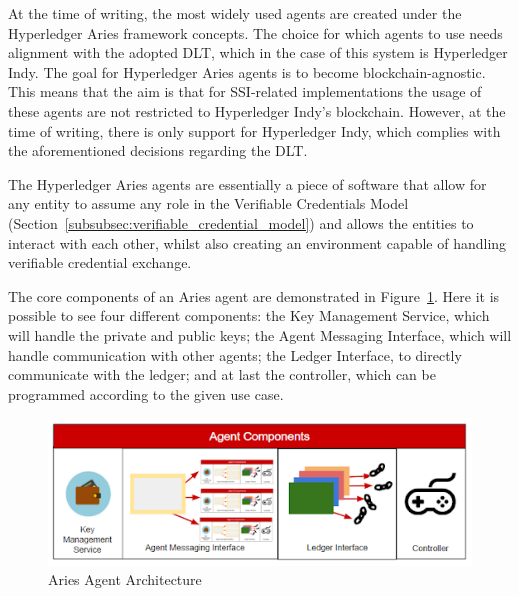 At the time of writing, the most widely used agents are created under the Hyperledger Aries framework concepts. The choice for which agents to use needs alignment with the adopted DLT, which in the case of this system is Hyperledger Indy. The goal for Hyperledger Aries agents is to become blockchain-agnostic. This means that the aim is that for SSI-related implementations the usage of these agents are not restricted to Hyperledger Indy's blockchain. However, at the time of writing, there is only support for Hyperledger Indy, which complies with the aforementioned decisions regarding the DLT.

The Hyperledger Aries agents are essentially a piece of software that allow for any entity to assume any role in the Verifiable Credentials Model (Section~\ref{subsubsec:verifiable_credential_model}) and allows the entities to interact with each other, whilst also creating an environment capable of handling verifiable credential exchange. 

The core components of an Aries agent are demonstrated in Figure~\ref{fig:aries_agent_architecture}. Here it is possible to see four different components: the Key Management Service, which will handle the private and public keys; the Agent Messaging Interface, which will handle communication with other agents; the Ledger Interface, to directly communicate with the ledger; and at last the controller, which can be programmed according to the given use case.

\begin{figure}[!htb]
    \centering
    \includegraphics[width=0.7\linewidth]{images/Agent_Components.png}
    \caption[Aries Agent Architecture]{Aries Agent Architecture\protect \footnotemark}
    \label{fig:aries_agent_architecture}
\end{figure}


